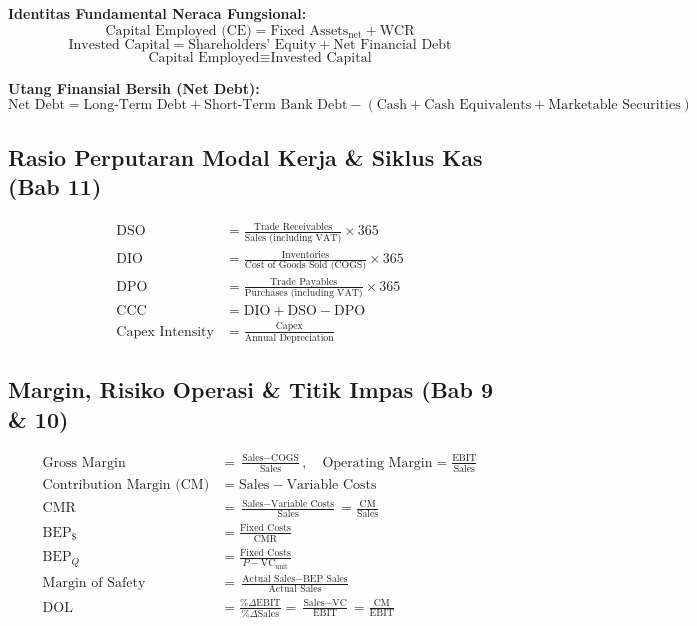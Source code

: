 \documentclass[10pt,a4paper]{article}
\begin{document}
\textbf{Identitas Fundamental Neraca Fungsional:}
\begin{equation}
\text{Capital Employed (CE)} = \text{Fixed Assets}_{\text{net}} + \text{WCR}
\end{equation}
\begin{equation}
\text{Invested Capital} = \text{Shareholders' Equity} + \text{Net Financial Debt}
\end{equation}
\begin{equation}
\text{Capital Employed} \equiv \text{Invested Capital}
\end{equation}

\textbf{Utang Finansial Bersih (Net Debt):}
\begin{equation}
\text{Net Debt} = \text{Long-Term Debt} + \text{Short-Term Bank Debt} - (\text{Cash} + \text{Cash Equivalents} + \text{Marketable Securities})
\end{equation}

\subsection{Rasio Perputaran Modal Kerja \& Siklus Kas (Bab 11)}

\begin{align}
\text{DSO} &= \frac{\text{Trade Receivables}}{\text{Sales (including VAT)}} \times 365 \\
\text{DIO} &= \frac{\text{Inventories}}{\text{Cost of Goods Sold (COGS)}} \times 365 \\
\text{DPO} &= \frac{\text{Trade Payables}}{\text{Purchases (including VAT)}} \times 365 \\
\text{CCC} &= \text{DIO} + \text{DSO} - \text{DPO} \\
\text{Capex Intensity} &= \frac{\text{Capex}}{\text{Annual Depreciation}}
\end{align}

\subsection{Margin, Risiko Operasi \& Titik Impas (Bab 9 \& 10)}

\begin{align}
\text{Gross Margin} &= \frac{\text{Sales} - \text{COGS}}{\text{Sales}}, \quad \text{Operating Margin} = \frac{\text{EBIT}}{\text{Sales}} \\
\text{Contribution Margin (CM)} &= \text{Sales} - \text{Variable Costs} \\
\text{CMR} &= \frac{\text{Sales} - \text{Variable Costs}}{\text{Sales}} = \frac{\text{CM}}{\text{Sales}} \\
\text{BEP}_{\$} &= \frac{\text{Fixed Costs}}{\text{CMR}} \\
\text{BEP}_{Q} &= \frac{\text{Fixed Costs}}{P - \text{VC}_{\text{unit}}} \\
\text{Margin of Safety} &= \frac{\text{Actual Sales} - \text{BEP Sales}}{\text{Actual Sales}} \\
\text{DOL} &= \frac{\% \Delta \text{EBIT}}{\% \Delta \text{Sales}} = \frac{\text{Sales} - \text{VC}}{\text{EBIT}} = \frac{\text{CM}}{\text{EBIT}}
\end{align}
\end{document}
